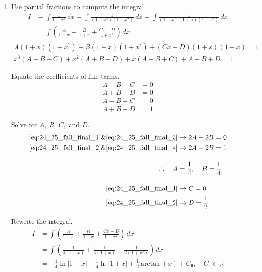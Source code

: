 \documentclass[a4paper, 12pt]{article}
\begin{document}
\begin{enumerate}[leftmargin=*,label=\textbf{\arabic*.}]
\begin{enumerate}[leftmargin=*,label=\textbf{\alph*.}]
\item Use partial fractions to compute the integral.
\begin{align*}I&=\int\frac1{1-x^4}\,dx=\int\frac1{\left(1-x^2\right)\left(1+x^2\right)}\,dx=\int\frac1{(1-x)(1+x)\left(1+x^2\right)}\,dx\\[1em]&=\int\left(\frac A{1-x}+\frac B{1+x}+\frac{Cx+D}{1+x^2}\right)\,dx\end{align*}
\[\begin{array}{c}
A(1+x)\left(1+x^2\right)+B(1-x)\left(1+x^2\right)+(Cx+D)(1+x)(1-x)=1\\
x^3(A-B-C)+x^2\left(A+B-D\right)+x\left(A-B+C\right)+A+B+D=1
\end{array}\]

Equate the coefficients of like terms.
\begin{align}
A-B-C&=0 \label{eq:24_25_fall_final_1}\\
A+B-D&=0 \label{eq:24_25_fall_final_2}\\
A-B+C&=0 \label{eq:24_25_fall_final_3}\\
A+B+D&=1 \label{eq:24_25_fall_final_4}
\end{align}

Solve for $A,\:B,\:C,$ and $D$.
\begin{align*}
\eqref{eq:24_25_fall_final_1} \& \eqref{eq:24_25_fall_final_3} &\rightarrow 2A-2B=0 \\
\eqref{eq:24_25_fall_final_2} \& \eqref{eq:24_25_fall_final_4} &\rightarrow 2A+2B=1 \\[1em]
\therefore\quad A&=\dfrac{1}{4},\quad B=\dfrac{1}{4} \\[1em]
\eqref{eq:24_25_fall_final_1} &\rightarrow C=0 \\
\eqref{eq:24_25_fall_final_2} &\rightarrow D=\dfrac{1}{2}
\end{align*}

Rewrite the integral.
\begin{align*}I&=\int\left(\frac A{1-x}+\frac B{1+x}+\frac{Cx+D}{1+x^2}\right)\,dx\\[1em]&=\int\left(\frac1{4(1-x)}+\frac1{4(1+x)}+\frac1{2\left(1+x^2\right)}\right)\,dx\\[1em]&=\boxed{-\frac14\ln|1-x|+\frac14\ln|1+x|+\frac12\arctan\left(x\right)+C_0,\quad C_0\in\mathbb{R}}\end{align*}


\end{enumerate}
\end{enumerate}
\end{document}
